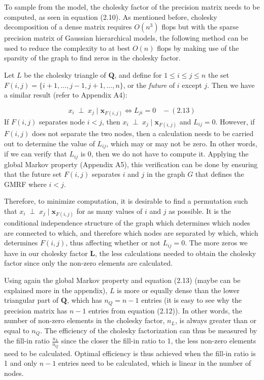 \documentclass[]{article}
\begin{document}
 \newline 

To sample from the model, the cholesky factor of the precision matrix
needs to be computed, as seen in equation (2.10). As mentioned before,
cholesky decomposition of a dense matrix requires \(O(n^3)\) flops but
with the sparse precision matrix of Gaussian hierarchical models, the
following method can be used to reduce the complexity to at best
\(O(n)\) flops by making use of the sparsity of the graph to find zeros
in the cholesky factor.

Let \(L\) be the cholesky triangle of \(\boldsymbol{Q}\), and define for
\(1\leq i \leq j \leq n\) the set
\(F(i,j) = \{i+1, ..., j-1, j+1, ..., n\}\), or the \emph{future} of
\(i\) except \(j\). Then we have a similar result (refer to Appendix
A4):

\[x_i \; \perp \; x_j \;|\; \boldsymbol{x}_{F(i,j)} \iff L_{ji}=0 \;\;\; - (2.13)\]
If \(F(i,j)\) separates node \(i<j\), then
\(x_i \; \perp \; x_j \;|\; \boldsymbol{x}_{F(i,j)}\) and \(L_{ij}=0\).
However, if \(F(i,j)\) does not separate the two nodes, then a
calculation needs to be carried out to determine the value of
\(L_{ij}\), which may or may not be zero. In other words, if we can
verify that \(L_{ij}\) is 0, then we do not have to compute it. Applying
the global Markov property (Appendix A5), this verification can be done
by ensuring that the future set \(F(i,j)\) separates \(i\) and \(j\) in
the graph \(G\) that defines the GMRF where \(i<j\).

Therefore, to minimize computation, it is desirable to find a
permutation such that
\(x_i \; \perp \; x_j \;|\; \boldsymbol{x}_{F(i,j)}\) for as many values
of \(i\) and \(j\) as possible. It is the conditional independence
structure of the graph which determines which nodes are connected to
which, and therefore which nodes are separated by which, which
determines \(F(i,j)\), thus affecting whether or not \(L_{ij}=0\). The
more zeros we have in our cholesky factor \(\boldsymbol{L}\), the less
calculations needed to obtain the cholesky factor since only the
non-zero elements are calculated.

Using again the global Markov property and equation (2.13) (maybe can be
explained more in the appendix), \(L\) is more or equally dense than the
lower triangular part of \(\boldsymbol{Q}\), which has \(n_Q = n-1\)
entries (it is easy to see why the precision matrix has \(n-1\) entries
from equation (2.12)). In other words, the number of non-zero elements
in the cholesky factor, \(n_L\), is always greater than or equal to
\(n_Q\). The efficiency of the cholesky factorization can thus be
measured by the fill-in ratio \(\frac{n_L}{n_Q}\) since the closer the
fill-in ratio to 1, the less non-zero elements need to be calculated.
Optimal efficiency is thus achieved when the fill-in ratio is 1 and only
\(n-1\) entries need to be calculated, which is linear in the number of
nodes.
\end{document}
